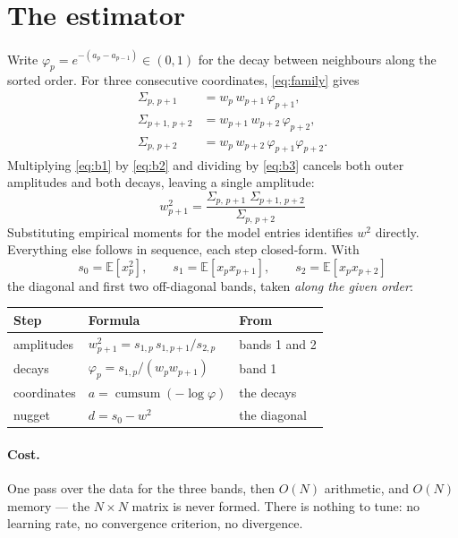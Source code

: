 \documentclass[11pt,a4paper]{article}
\begin{document}
\section{The estimator}
\label{sec:estimator}

Write $\varphi_p = e^{-(a_p - a_{p-1})} \in (0,1)$ for the decay between neighbours along the
sorted order. For three consecutive coordinates, \eqref{eq:family} gives
\begin{align}
  \Sigma_{p,\,p+1}   &= w_p\, w_{p+1}\, \varphi_{p+1}, \label{eq:b1}\\
  \Sigma_{p+1,\,p+2} &= w_{p+1}\, w_{p+2}\, \varphi_{p+2}, \label{eq:b2}\\
  \Sigma_{p,\,p+2}   &= w_p\, w_{p+2}\, \varphi_{p+1}\varphi_{p+2}. \label{eq:b3}
\end{align}
Multiplying \eqref{eq:b1} by \eqref{eq:b2} and dividing by \eqref{eq:b3} cancels both outer
amplitudes and both decays, leaving a single amplitude:
\begin{equation}
  \boxed{\;
  w_{p+1}^{2}
  = \frac{\Sigma_{p,\,p+1}\; \Sigma_{p+1,\,p+2}}{\Sigma_{p,\,p+2}}
  \;}
  \label{eq:key}
\end{equation}
Substituting empirical moments for the model entries identifies $w^2$ directly. Everything else
follows in sequence, each step closed-form. With
\[
  s_0 = \mathbb{E}\!\left[x_p^2\right], \qquad
  s_1 = \mathbb{E}\!\left[x_p x_{p+1}\right], \qquad
  s_2 = \mathbb{E}\!\left[x_p x_{p+2}\right]
\]
the diagonal and first two off-diagonal bands, taken \emph{along the given order}:

\begin{center}
\begin{tabular}{@{}lll@{}}
\toprule
Step & Formula & From \\
\midrule
amplitudes  & $w^2_{p+1} = s_{1,p}\, s_{1,p+1} / s_{2,p}$        & bands 1 and 2 \\
decays      & $\varphi_p = s_{1,p} / (w_p w_{p+1})$              & band 1 \\
coordinates & $a = \operatorname{cumsum}(-\log \varphi)$          & the decays \\
nugget      & $d = s_0 - w^2$                                     & the diagonal \\
\bottomrule
\end{tabular}
\end{center}

\paragraph{Cost.} One pass over the data for the three bands, then $O(N)$ arithmetic, and
$O(N)$ memory --- the $N \times N$ matrix is never formed. There is nothing to tune: no
learning rate, no convergence criterion, no divergence.
\end{document}
